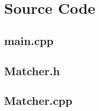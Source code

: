 \section{Source Code}



\subsection{main.cpp}
\label{app:main_cpp}

\bigskip
\bigskip

\subsection{Matcher.h}
\label{app:matcher_h}

\bigskip
\bigskip

\subsection{Matcher.cpp}
\label{app:matcher_cpp}

\bigskip
\bigskip
